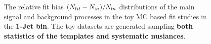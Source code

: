\begin{figure}[!hbtp]
{} 

\caption{The relative fit bias $(N_{\text fit} - N_{\text in})/N_{\text in}$ distributions 
of the main signal and background processes in the toy MC based fit studies in the {\bf 1-Jet bin}. 
The toy datasets are generated sampling {\bf both statistics of the templates and systematic nusiances}. }
\label{fig:toyfit_1j}
\end{figure}




